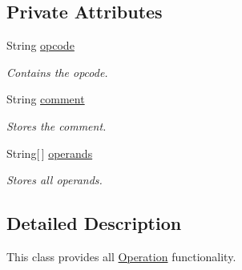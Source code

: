 \subsection*{Private Attributes}
\begin{DoxyCompactItemize}
\item 
String \hyperlink{classOperation_a91a69611ab1dd4ca12de1abdd49c2b42}{opcode}
\begin{DoxyCompactList}\small\item\em Contains the opcode. \item\end{DoxyCompactList}\item 
String \hyperlink{classOperation_a3b56588030b54deb7ffb0c5f0a4ebe68}{comment}
\begin{DoxyCompactList}\small\item\em Stores the comment. \item\end{DoxyCompactList}\item 
String\mbox{[}$\,$\mbox{]} \hyperlink{classOperation_ae5923860533d63c6a35d658b2683a994}{operands}
\begin{DoxyCompactList}\small\item\em Stores all operands. \item\end{DoxyCompactList}\end{DoxyCompactItemize}


\subsection{Detailed Description}
This class provides all \hyperlink{classOperation}{Operation} functionality. 

